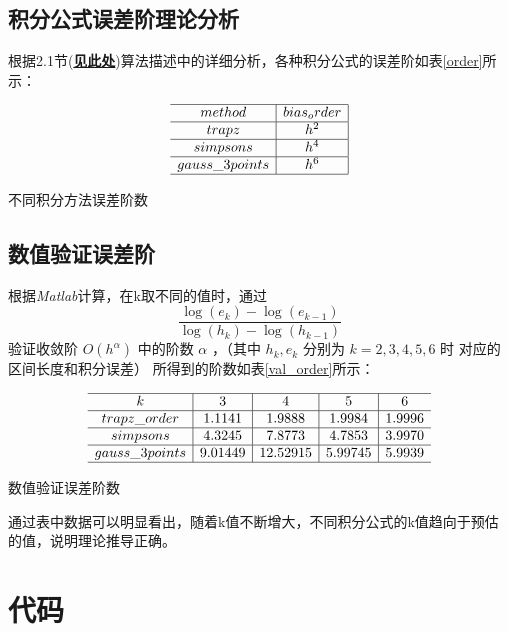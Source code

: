 \documentclass{ctexart}%
\begin{document}
\subsection{积分公式误差阶理论分析}
根据2.1节(\hyperlink{wucha}{\textbf{见此处}})算法描述中的详细分析，各种积分公式的误差阶如表\ref{order}所示：
\begin{table}[H]
$$
\begin{array}{c|c|c}
\hline method & bias_order \\
\hline trapz & h^{2} \\
\hline simpsons & h^{4}  \\
\hline gauss\_3points & h^{6} \\%
\hline
\end{array}
$$
\caption{不同积分方法误差阶数}
\label{order}%
\end{table}
\subsection{数值验证误差阶}

根据\textit{Matlab}计算，在k取不同的值时，通过$$\frac{\log \left(e_{k}\right)-\log \left(e_{k-1}\right)}{\log \left(h_{k}\right)-\log \left(h_{k-1}\right)}$$ 验证收敛阶 $O\left(h^{\alpha}\right)$ 中的阶数 $\alpha$  ，（其中 $h_{k}, e_{k}$ 分别为 $k=2,3,4,5,6$ 时 对应的区间长度和积分误差）
所得到的阶数如表\ref{val_order}所示：
\begin{table}[H]
$$
\begin{array}{c|c|c|c|c}
\hline k &3&4&5&6 \\
\hline trapz\_order &1.1141 &1.9888&1.9984&1.9996\\
\hline simpsons & 4.3245 &7.8773 & 4.7853&3.9970 \\
\hline gauss\_3points & 9.01449&12.52915&5.99745&5.9939 \\

\hline
\end{array}
$$
\caption{数值验证误差阶数}
\label{val_order}%
\end{table}

通过表中数据可以明显看出，随着k值不断增大，不同积分公式的k值趋向于预估的值，说明理论推导正确。


\clearpage
\section{代码}
\end{document}
